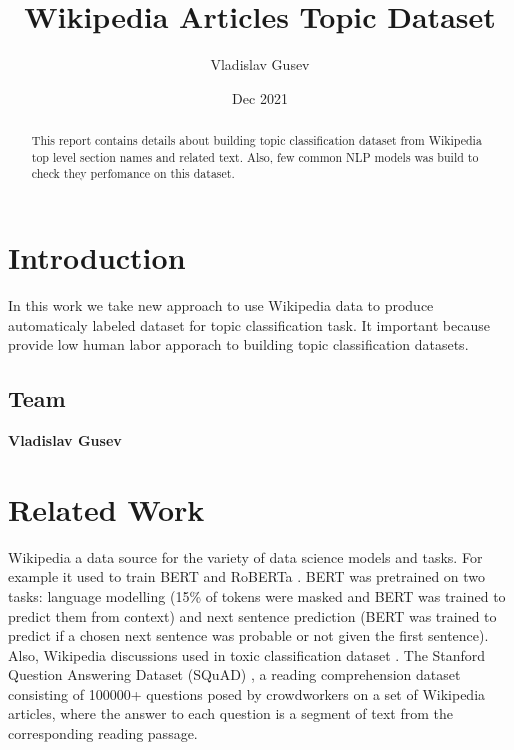 \documentclass{article}
\title{Wikipedia Articles Topic Dataset}
\author{Vladislav Gusev}
\date{Dec 2021}
\begin{document}
\maketitle
\begin{abstract}
    This report contains details about building topic classification dataset from Wikipedia top level section names and related text. Also, few common NLP models was build to check they perfomance on this dataset.
\end{abstract}


\section{Introduction}
In this work we take new approach to use Wikipedia data to produce automaticaly labeled dataset for topic classification task. It important because provide low human labor apporach to building topic classification datasets. 

\subsection{Team}
\textbf{Vladislav Gusev}

\section{Related Work}
\label{sec:related}
Wikipedia a data source for the variety of data science models and tasks. For example it used to train BERT \cite{Devlin2018} and RoBERTa \cite{yinhan2019roberta}. 
BERT was pretrained on two tasks: language modelling (15\% of tokens were masked and BERT was trained to predict them from context) and next sentence prediction (BERT was trained to predict if a chosen next sentence was probable or not given the first sentence).
Also, Wikipedia discussions used in toxic classification dataset \cite{thain2017wikipedia}.
The Stanford Question Answering Dataset (SQuAD) \cite{rajpurkar2016squad}, a reading comprehension dataset consisting of 100000+ questions posed by crowdworkers on a set of Wikipedia articles, where the answer to each question is a segment of text from the corresponding reading passage.
\end{document}
